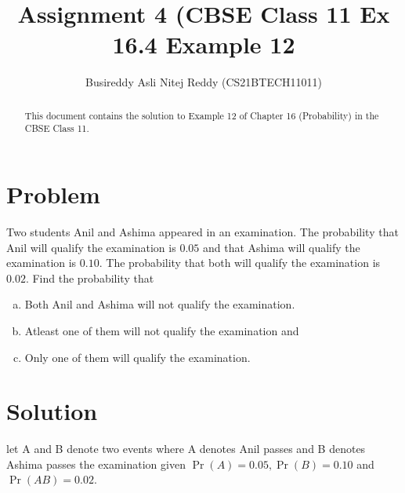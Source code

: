 \documentclass[journal,12pt,twocolumn]{IEEEtran}
\title{Assignment 4 (CBSE Class 11 Ex 16.4 Example 12	 }
\author{Busireddy Asli Nitej Reddy (CS21BTECH11011)}
\date{}
\providecommand{\pr}[1]{\ensuremath{\Pr\left(#1\right)}}
\begin{document}
\maketitle



\begin{abstract}
This document contains the solution to Example 12 of Chapter 16 (Probability) in the CBSE Class 11.
\end{abstract}



\section*{\textbf{Problem}}

  Two students Anil and Ashima appeared in an examination. The probability that Anil will qualify the examination is $0.05$ and that Ashima will qualify the examination is $0.10$. The probability that both will qualify the examination is $0.02$. Find the probability that
     \begin{enumerate}[a)]
         \item Both Anil and Ashima will not qualify the examination.
         \item Atleast one of them will not qualify the examination and
         \item Only one of them will qualify the examination.
     \end{enumerate}



\section*{\textbf{Solution}}

let A and B denote two events where A denotes Anil passes and B denotes Ashima passes the examination given $\pr{A} = 0.05, \pr{B} = 0.10 $ and $\pr{A B} = 0.02 $. 
\end{document}
